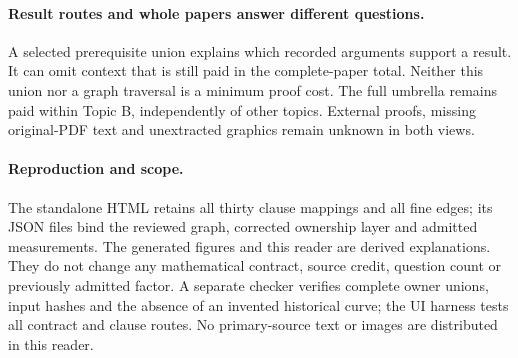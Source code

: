 \documentclass[11pt,a4paper]{article}
\begin{document}
\paragraph{Result routes and whole papers answer different questions.}
A selected prerequisite union explains which recorded arguments support a
result. It can omit context that is still paid in the complete-paper total.
Neither this union nor a graph traversal is a minimum proof cost. The full
umbrella remains paid within Topic B, independently of other topics.
External proofs, missing original-PDF text and unextracted graphics remain
unknown in both views.

\paragraph{Reproduction and scope.}
The standalone HTML retains all thirty clause mappings and all fine edges;
its JSON files bind the reviewed graph, corrected ownership layer and
admitted measurements. The generated figures and this reader are derived
explanations. They do not change any mathematical contract, source credit,
question count or previously admitted factor. A separate checker verifies
complete owner unions, input hashes and the absence of an invented historical
curve; the UI harness tests all contract and clause routes. No primary-source
text or images are distributed in this reader.
\end{document}
